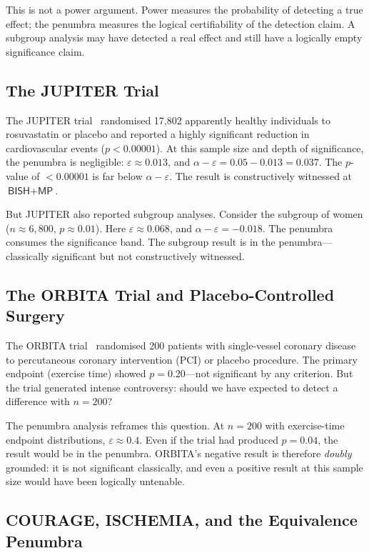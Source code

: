 \documentclass[11pt,a4paper]{article}
\theoremstyle{plain}
\theoremstyle{definition}
\newcommand{\BISH}{\textsf{BISH}}
\newcommand{\MP}{\textsf{MP}}
\begin{document}
This is not a power argument.  Power measures the probability of detecting a true effect; the penumbra measures the logical certifiability of the detection claim.  A subgroup analysis may have detected a real effect and still have a logically empty significance claim.

\subsection{The JUPITER Trial}

The JUPITER trial~\cite{ridker-jupiter} randomised 17{,}802 apparently healthy individuals to rosuvastatin or placebo and reported a highly significant reduction in cardiovascular events ($p < 0.00001$).  At this sample size and depth of significance, the penumbra is negligible: $\varepsilon \approx 0.013$, and $\alpha - \varepsilon = 0.05 - 0.013 = 0.037$.  The $p$-value of $< 0.00001$ is far below $\alpha - \varepsilon$.  The result is constructively witnessed at $\BISH + \MP$.

But JUPITER also reported subgroup analyses.  Consider the subgroup of women ($n \approx 6{,}800$, $p \approx 0.01$).  Here $\varepsilon \approx 0.068$, and $\alpha - \varepsilon = -0.018$.  The penumbra consumes the significance band.  The subgroup result is in the penumbra---classically significant but not constructively witnessed.

\subsection{The ORBITA Trial and Placebo-Controlled Surgery}

The ORBITA trial~\cite{al-lamee-orbita} randomised 200 patients with single-vessel coronary disease to percutaneous coronary intervention (PCI) or placebo procedure.  The primary endpoint (exercise time) showed $p = 0.20$---not significant by any criterion.  But the trial generated intense controversy: should we have expected to detect a difference with $n = 200$?

The penumbra analysis reframes this question.  At $n = 200$ with exercise-time endpoint distributions, $\varepsilon \approx 0.4$.  Even if the trial had produced $p = 0.04$, the result would be in the penumbra.  ORBITA's negative result is therefore \emph{doubly} grounded: it is not significant classically, and even a positive result at this sample size would have been logically untenable.

\subsection{COURAGE, ISCHEMIA, and the Equivalence Penumbra}
\end{document}
